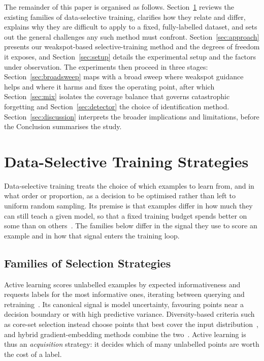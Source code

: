 \documentclass[conference]{IEEEtran}
\begin{document}
The remainder of this paper is organised as follows.
Section~\ref{sec:strategies} reviews the existing families of data-selective
training, clarifies how they relate and differ, explains why they are difficult
to apply to a fixed, fully-labelled dataset, and sets out the general challenges
any such method must confront. Section~\ref{sec:approach} presents our
weakspot-based selective-training method and the degrees of freedom it exposes,
and Section~\ref{sec:setup} details the experimental setup and the factors under
observation. The experiments then proceed in three stages: Section~\ref{sec:broadsweep}
maps with a broad sweep where weakspot guidance helps and where it harms and fixes the
operating point, after which Section~\ref{sec:mix} isolates the coverage balance that
governs catastrophic forgetting and Section~\ref{sec:detector} the choice of
identification method. Section~\ref{sec:discussion} interprets the broader implications
and limitations, before the Conclusion summarises the study.

\section{Data-Selective Training Strategies}
\label{sec:strategies}

Data-selective training treats the choice of which examples to learn from, and in
what order or proportion, as a decision to be optimised rather than left to uniform
random sampling. Its premise is that examples differ in how much they can still
teach a given model, so that a fixed training budget spends better on some than on
others~\cite{katharopoulos2018,sorscher2022}. The families below differ in the
signal they use to score an example and in how that signal enters the training loop.

\subsection{Families of Selection Strategies}
\label{sec:families}

Active learning scores unlabelled examples by expected informativeness and
requests labels for the most informative ones, iterating between querying and
retraining~\cite{settles2009,cohn1996}. Its canonical signal is model
uncertainty, favouring points near a decision boundary or with high predictive
variance. Diversity-based criteria such as core-set selection instead choose
points that best cover the input distribution~\cite{sener2018}, and hybrid
gradient-embedding methods combine the two~\cite{ash2020}. Active learning is
thus an \emph{acquisition} strategy: it decides which of many unlabelled points
are worth the cost of a label.
\end{document}
